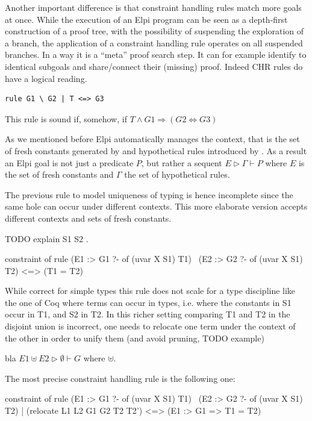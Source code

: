 \documentclass[a4paper, 11pt]{book}
\begin{document}
Another important difference is that constraint handling rules
match more goals at once. While the execution of an Elpi program
can be seen as a depth-first construction of a proof tree, with
the possibility of suspending the exploration of a branch, the
application of a constraint handling rule operates on all suspended
branches. In a way it is a ``meta'' proof search step. It can for
example identify to identical subgoals and share/connect their (missing)
proof. Indeed CHR rules do have a logical reading.

\begin{verbatim}
rule G1 \ G2 | T <=> G3
\end{verbatim}

This rule is sound if, somehow, if $T \land G1 \Rightarrow (G2 \Leftrightarrow G3)$
  
As we mentioned before Elpi automatically manages the context, that is
the set of fresh constants generated by  and hypothetical
rules introduced by \elpiinline{=>}. As a result an Elpi goal is
not just a predicate $P$, but rather a sequent $E \triangleright  \Gamma \vdash P$
where $E$ is the set of fresh constants and $\Gamma$ the set of hypothetical rules.

The previous rule to model uniqueness of typing is hence incomplete
since the same hole can occur under different contexts. This more
elaborate version accepts different contexts and sets of fresh constants.

TODO explain S1 S2 \cite{joijgov}.

\begin{elpicode}
constraint of {
  rule (E1 :> G1 ?- of (uvar X S1) T1) \ (E2 :> G2 ?- of (uvar X S1) T2)
    <=> (T1 = T2)
}
\end{elpicode}

While correct for simple types this rule does not scale for a type
discipline like the one of Coq where terms can occur in types,
i.e. where the constants in S1 occur in T1, and S2 in T2. In this
richer setting comparing T1 and T2 in the disjoint union is incorrect,
one needs to relocate one term under the context of the other in order
to unify them (and avoid pruning, TODO example)

bla $E1 \uplus E2 \triangleright \emptyset \vdash G$ where $\uplus$.

The most precise constraint handling rule is the following one:

\begin{elpicode}
constraint of {
  rule (E1 :> G1 ?- of (uvar X S1) T1) \ (E2 :> G2 ?- of (uvar X S1) T2)
    | (relocate L1 L2 G1 G2 T2 T2')
    <=> (E1 :> G1 => T1 = T2)
}
\end{elpicode}
\end{document}
